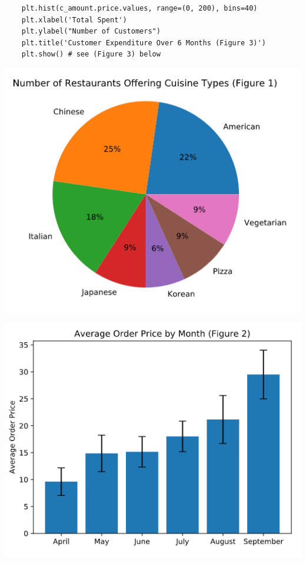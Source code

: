 \documentclass[11pt, a4paper]{article}
\begin{document}
\begin{spacing}{1.1}
\begin{lstlisting}
	plt.hist(c_amount.price.values, range=(0, 200), bins=40)
	plt.xlabel('Total Spent')
	plt.ylabel("Number of Customers")
	plt.title('Customer Expenditure Over 6 Months (Figure 3)')
	plt.show() # see (Figure 3) below	\end{lstlisting}\vspace*{1mm}
	\begin{minipage}[c]{5.5cm}
		\includegraphics[scale=.39]{figure1}
	\end{minipage}
	\begin{minipage}[c]{6cm}
		\includegraphics[scale=.39]{figure2}
	\end{minipage}

\end{spacing}
\end{document}
